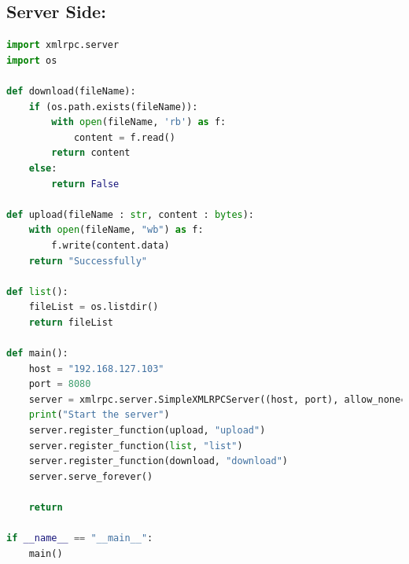 \documentclass{article}
\begin{document}
	\subsection*{Server Side:}
	\begin{lstlisting}[language=Python, caption={Server Main Function}, label={lst:server_main}]
import xmlrpc.server
import os

def download(fileName):
	if (os.path.exists(fileName)):
		with open(fileName, 'rb') as f:
			content = f.read()
		return content    
	else:
		return False

def upload(fileName : str, content : bytes):
	with open(fileName, "wb") as f:
		f.write(content.data)
	return "Successfully"

def list():
	fileList = os.listdir()
	return fileList

def main():
	host = "192.168.127.103"
	port = 8080
	server = xmlrpc.server.SimpleXMLRPCServer((host, port), allow_none=True)
	print("Start the server")
	server.register_function(upload, "upload")
	server.register_function(list, "list")
	server.register_function(download, "download")
	server.serve_forever()
	
	return 

if __name__ == "__main__":
	main()
	\end{lstlisting}
	
\end{document}
